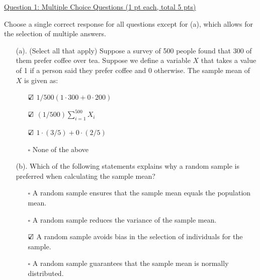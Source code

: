 \documentclass{./../../Latex/tests}
\begin{document}
\thispagestyle{plain}
\vspace{0.5em}


\underline{Question 1: Multiple Choice Questions (1 pt each, total 5 pts)}

Choose a single correct response for all questions except for (a), which allows for the selection of multiple answers.
\begin{enumerate}
	
\item[(a).] (Select all that apply) Suppose a survey of 500 people found that 300 of them prefer coffee over tea. Suppose we define a variable $X$ that takes a value of 1 if a person said they prefer coffee and 0 otherwise. The sample mean of $X$ is given as:
\begin{enumerate}
\item[$\text{\rlap{$\checkmark$}}\square$] $1/500(1\cdot 300 + 0\cdot 200) $ 
\item[$\text{\rlap{$\checkmark$}}\square$] $(1/500)\sum_{i=1}^{500} X_i$
\item[$\text{\rlap{$\checkmark$}}\square$] $1\cdot (3/5) + 0\cdot (2/5) $ 
\item[$\square$] None of the above \\
\end{enumerate}

\item[(b).] Which of the following statements explains why a random sample is preferred when calculating the sample mean?
\begin{enumerate}
\item[$\square$] A random sample ensures that the sample mean equals the population mean.
\item[$\square$] A random sample reduces the variance of the sample mean.
\item[$\text{\rlap{$\checkmark$}}\square$] A random sample avoids bias in the selection of individuals for the sample.
\item[$\square$] A random sample guarantees that the sample mean is normally distributed. \\
\end{enumerate}


\end{enumerate}
\end{document}
